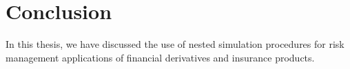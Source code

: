 \chapter{Conclusion} \label{chap:conclusion}

In this thesis, we have discussed the use of nested simulation procedures for risk management applications of financial derivatives and insurance products.
